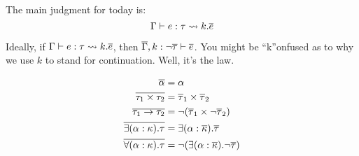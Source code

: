 
The main judgment for today is:
\[ \Gamma \vdash e : \tau \leadsto k . \overline{e} \]

Ideally, if $\Gamma \vdash e : \tau \leadsto k.\overline{e}$, then
$\overline{\Gamma}, k : \neg \overline{\tau} \vdash \overline{e}$. You might be ``k''onfused as to why we
use $k$ to stand for continuation. Well, it's the law.

\begin{judgment}
  \begin{align*}
    \overline{\alpha} &= \alpha\\
    \overline{\tau_1 \times \tau_2} &= \overline{\tau}_1 \times \overline{\tau}_2\\
    \overline{\tau_1 \to \tau_2} &= \neg (\overline{\tau}_1 \times \neg \overline{\tau}_2)\\
    \overline{\exists(\alpha : \kappa).\tau} &= \exists (\alpha : \overline{\kappa}).\overline{\tau}\\
    \overline{\forall(\alpha : \kappa).\tau} &= \neg(\exists (\alpha : \overline{\kappa}).\neg\overline{\tau})\\
  \end{align*}
\end{judgment}


